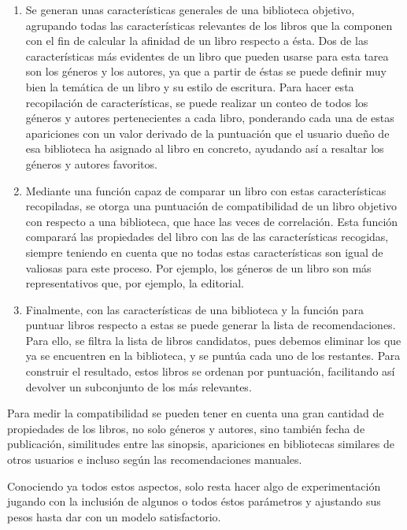 \begin{enumerate}
    \item Se generan unas características generales de una biblioteca objetivo, agrupando todas las características relevantes de los libros que la componen con el fin de calcular la afinidad de un libro respecto a ésta. Dos de las características más evidentes de un libro que pueden usarse para esta tarea son los géneros y los autores, ya que a partir de éstas se puede definir muy bien la temática de un libro y su estilo de escritura. Para hacer esta recopilación de características, se puede realizar un conteo de todos los géneros y autores pertenecientes a cada libro, ponderando cada una de estas apariciones con un valor derivado de la puntuación que el usuario dueño de esa biblioteca ha asignado al libro en concreto, ayudando así a resaltar los géneros y autores favoritos.
    \item Mediante una función capaz de comparar un libro con estas características recopiladas, se otorga una puntuación de compatibilidad de un libro objetivo con respecto a una biblioteca, que hace las veces de correlación. Esta función comparará las propiedades del libro con las de las características recogidas, siempre teniendo en cuenta que no todas estas características son igual de valiosas para este proceso. Por ejemplo, los géneros de un libro son más representativos que, por ejemplo, la editorial.
    \item Finalmente, con las características de una biblioteca y la función para puntuar libros respecto a estas se puede generar la lista de recomendaciones. Para ello, se filtra la lista de libros candidatos, pues debemos eliminar los que ya se encuentren en la biblioteca, y se puntúa cada uno de los restantes. Para construir el resultado, estos libros se ordenan por puntuación, facilitando así devolver un subconjunto de los más relevantes.
\end{enumerate}

Para medir la compatibilidad se pueden tener en cuenta una gran cantidad de propiedades de los libros, no solo géneros y autores, sino también fecha de publicación, similitudes entre las sinopsis, apariciones en bibliotecas similares de otros usuarios e incluso según las recomendaciones manuales.

Conociendo ya todos estos aspectos, solo resta hacer algo de experimentación jugando con la inclusión de algunos o todos éstos parámetros y ajustando sus pesos hasta dar con un modelo satisfactorio.


